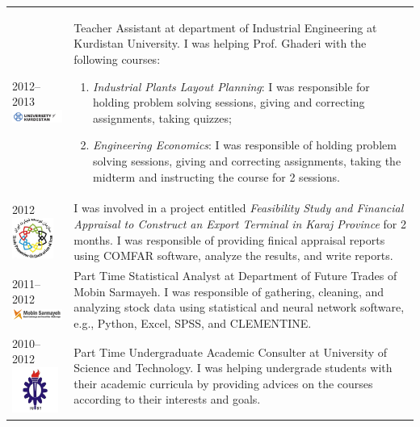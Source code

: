 \documentclass[10PT,letter]{article}
\begin{document}
\begin{tabular}{p{1.2in}p{5.55in}}
						\textsc{2012--2013}\vspace{1mm}\newline \includegraphics[width=2.75cm]{static/logos/UoK} &
												Teacher Assistant at department of Industrial Engineering at Kurdistan University. I was helping Prof. Ghaderi with the following courses:
												\begin{enumerate}
													\item \textit{Industrial Plants Layout Planning}: I was responsible for  holding problem solving sessions, giving and correcting assignments, taking quizzes;
													\item \textit{Engineering Economics}: I was responsible of holding problem solving sessions, giving and correcting assignments, taking the midterm and instructing the course for 2 sessions.
												\end{enumerate}
											 \\[3mm]
						\textsc{2012}\vspace{1mm}\newline \includegraphics[width=1.35cm]{static/logos/TPOI} &
										I was involved in a project entitled \textit{Feasibility Study and Financial Appraisal to Construct an Export Terminal in Karaj Province} for 2 months. 
										I was responsible of providing finical appraisal reports using COMFAR software, analyze the results, and write reports. \\[3mm]
						
						\textsc{2011--2012}\vspace{1mm}\newline \includegraphics[width=2.75cm]{static/logos/Mobien} &
											Part Time Statistical Analyst at Department of Future Trades of Mobin Sarmayeh.
											I was responsible of gathering, cleaning, and analyzing   stock  data using statistical and neural network software, e.g., Python, Excel, SPSS, and CLEMENTINE. \\[3mm]
											
						\textsc{2010--2012}\vspace{1mm}\newline \includegraphics[width=1.5cm]{static/logos/IUST} &
										Part Time Undergraduate Academic Consulter  at University of Science and Technology. 
										I was helping undergrade students with their academic curricula by providing advices on the courses according to their interests and goals. \\[3mm]
										

\end{tabular}
\end{document}
